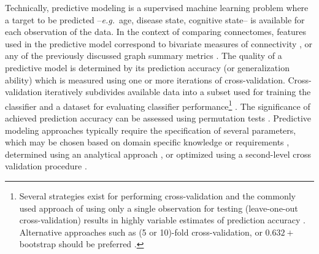 \documentclass[5p]{elsarticle}
\begin{document}
Technically, predictive modeling is a supervised machine learning problem where
a target to be predicted --\emph{e.g.}\ age, disease state, cognitive state-- is
available for each observation of the data. In the context of comparing
connectomes, features used in the predictive model correspond to bivariate
measures of connectivity \cite{richiardi2011,dosenbach2010,shirer2012}, or any of the previously discussed graph
summary metrics \cite{cecchi2009,ekman2012}.  
%
The quality of a predictive model is determined by its prediction accuracy (or
generalization ability) which is measured using one or more iterations of
cross-validation. Cross-validation iteratively subdivides available data into a
subset used for training the classifier and a dataset for evaluating classifier
performance\footnote{Several strategies exist for performing cross-validation and the commonly
used approach of using only a single observation for testing (leave-one-out
cross-validation) results in highly variable estimates of prediction accuracy
\cite{friedman2001}.
Alternative approaches such as (5 or 10)-fold cross-validation,
or $0.632+$ bootstrap should be preferred \cite{friedman2001}.} 
 \cite{pereira2009}.
The significance of
achieved prediction accuracy can be assessed using permutation tests
\cite{golland2003}.
Predictive modeling approaches typically require the specification of several
parameters, which may be chosen based on domain specific knowledge or
requirements \cite{cherkassky1998}, determined using an analytical approach
\cite{cherkassky2004}, or optimized using a second-level cross validation procedure
\cite{friedman2001}.  
\end{document}
